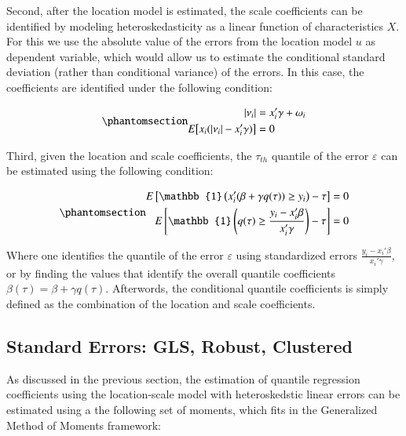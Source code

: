 \documentclass[
  authoryear,
  review,
  1p]{elsarticle}
\begin{document}
Second, after the location model is estimated, the scale coefficients
can be identified by modeling heteroskedasticity as a linear function of
characteristics \(X\). For this we use the absolute value of the errors
from the location model \(u\) as dependent variable, which would allow
us to estimate the conditional standard deviation (rather than
conditional variance) of the errors. In this case, the coefficients are
identified under the following condition:

\begin{equation}\phantomsection\label{eq-eq8}{\begin{aligned}
  |\nu_i| &=x_i'\gamma+\omega_i \\
   E\big[ x_i (|\nu_i| -x_i'\gamma ) \big] &=0
  \end{aligned}
}\end{equation}

Third, given the location and scale coefficients, the \(\tau_{th}\)
quantile of the error \(\varepsilon\) can be estimated using the
following condition:

\begin{equation}\phantomsection\label{eq-eq9}{\begin{aligned}
  E\left[  \mathbb{1}\left(x_i' (\beta +   \gamma q(\tau)) \geq y_i \right) - \tau \right] &=0  \\
  E\left[  \mathbb{1}\left(   q(\tau) \geq \frac{y_i-x_i'\beta}{x_i'\gamma} \right) - \tau \right] &=0  \\
  \end{aligned}
}\end{equation}

Where one identifies the quantile of the error \(\varepsilon\) using
standardized errors \(\frac{y_i-x_i'\beta}{x_i'\gamma}\), or by finding
the values that identify the overall quantile coefficients
\(\beta(\tau)=\beta + \gamma q(\tau)\). Afterwords, the conditional
quantile coefficients is simply defined as the combination of the
location and scale coefficients.

\subsection{Standard Errors: GLS, Robust, Clustered}\label{sec-se}

As discussed in the previous section, the estimation of quantile
regression coefficients using the location-scale model with
heteroskedstic linear errors can be estimated using a the following set
of moments, which fits in the Generalized Method of Moments framework:
\end{document}

